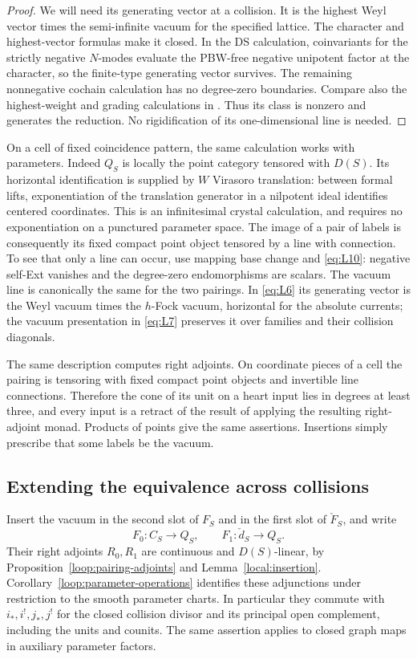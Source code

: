 \begin{proof}
We will need its generating vector at a collision.  It is the
highest Weyl vector times the semi-infinite vacuum for the specified
lattice.  The character and highest-vector formulas make it closed.
In the DS calculation, coinvariants for the strictly negative
$N$-modes evaluate the PBW-free negative unipotent factor at the
character, so the finite-type generating vector survives.  The
remaining nonnegative cochain calculation has no degree-zero
boundaries.  Compare also the highest-weight and grading calculations in
\cite[Sections~4.1 and~4.3]{ArakawaFrenkel}.  Thus its class is nonzero and
generates the reduction.  No rigidification of its one-dimensional
line is needed.
\end{proof}

On a cell of fixed coincidence pattern, the same calculation works
with parameters.  Indeed $Q_S$ is locally the point category tensored
with $D(S)$.  Its horizontal identification is supplied by $W$
Virasoro translation: between formal lifts, exponentiation of the
translation generator in a nilpotent ideal identifies centered
coordinates.  This is an infinitesimal crystal calculation, and
requires no exponentiation on a punctured parameter space.
The image of a pair of labels is consequently its fixed compact
point object tensored by a line with connection.  To see that only
a line can occur, use mapping base change and \eqref{eq:L10}:
negative self-Ext vanishes and the degree-zero endomorphisms are
scalars.  The vacuum line is canonically the same for the two
pairings.  In \eqref{eq:L6} its generating vector is the Weyl
vacuum times the $h$-Fock vacuum, horizontal for the absolute
currents; the vacuum presentation in \eqref{eq:L7} preserves it
over families and their collision diagonals.

The same description computes right adjoints.  On coordinate
pieces of a cell the pairing is tensoring with fixed compact point
objects and invertible line connections.  Therefore the cone of
its unit on a heart input lies in degrees at least three, and
every input is a retract of the result of applying the resulting
right-adjoint monad.  Products of points give the same assertions.
Insertions simply prescribe that some labels be the vacuum.

\subsection{Extending the equivalence across collisions}

Insert the vacuum in the second slot of $F_S$ and in the first
slot of $\check F_S$, and write
\[
 F_0:C_S\longrightarrow Q_S,\qquad
 F_1:\check d_S\longrightarrow Q_S.
\]
Their right adjoints $R_0,R_1$ are continuous and $D(S)$-linear,
by Proposition~\ref{loop:pairing-adjoints} and
Lemma~\ref{local:insertion}.  Corollary~\ref{loop:parameter-operations}
identifies these adjunctions under restriction to the smooth parameter
charts.  In particular they commute with $i_*,i^!,j_*,j^!$ for the
closed collision divisor and its principal open complement, including
the units and counits.  The same assertion applies to closed graph
maps in auxiliary parameter factors.

